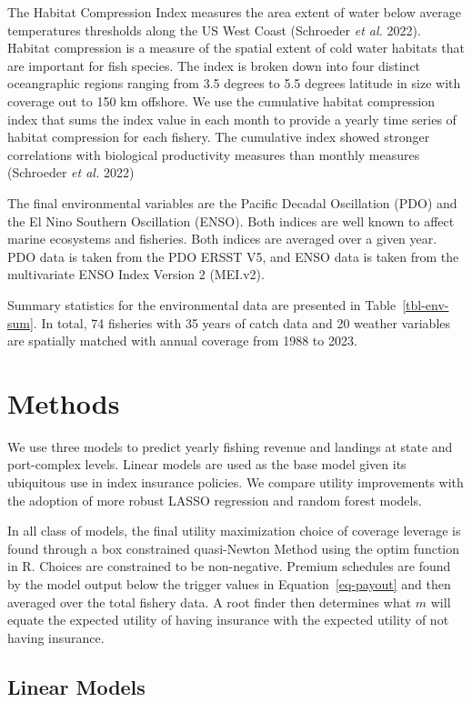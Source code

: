 \documentclass[
  letterpaper,
  DIV=11,
  numbers=noendperiod]{scrartcl}
\begin{document}
The Habitat Compression Index measures the area extent of water below
average temperatures thresholds along the US West Coast (Schroeder
\emph{et al.} 2022). Habitat compression is a measure of the spatial
extent of cold water habitats that are important for fish species. The
index is broken down into four distinct oceangraphic regions ranging
from 3.5 degrees to 5.5 degrees latitude in size with coverage out to
150 km offshore. We use the cumulative habitat compression index that
sums the index value in each month to provide a yearly time series of
habitat compression for each fishery. The cumulative index showed
stronger correlations with biological productivity measures than monthly
measures (Schroeder \emph{et al.} 2022)

The final environmental variables are the Pacific Decadal Oscillation
(PDO) and the El Nino Southern Oscillation (ENSO). Both indices are well
known to affect marine ecosystems and fisheries. Both indices are
averaged over a given year. PDO data is taken from the PDO ERSST V5, and
ENSO data is taken from the multivariate ENSO Index Version 2 (MEI.v2).

Summary statistics for the environmental data are presented in
Table~\ref{tbl-env-sum}. In total, 74 fisheries with 35 years of catch
data and 20 weather variables are spatially matched with annual coverage
from 1988 to 2023.

\hypertarget{sec-methods}{%
\section{Methods}\label{sec-methods}}

We use three models to predict yearly fishing revenue and landings at
state and port-complex levels. Linear models are used as the base model
given its ubiquitous use in index insurance policies. We compare utility
improvements with the adoption of more robust LASSO regression and
random forest models.

In all class of models, the final utility maximization choice of
coverage leverage is found through a box constrained quasi-Newton Method
using the optim function in R. Choices are constrained to be
non-negative. Premium schedules are found by the model output below the
trigger values in Equation~\ref{eq-payout} and then averaged over the
total fishery data. A root finder then determines what \(m\) will equate
the expected utility of having insurance with the expected utility of
not having insurance.

\hypertarget{linear-models}{%
\subsection{Linear Models}\label{linear-models}}
\end{document}
